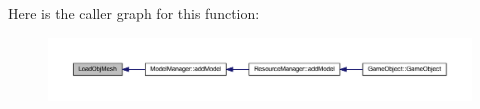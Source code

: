 Here is the caller graph for this function\+:\nopagebreak
\begin{figure}[H]
\begin{center}
\leavevmode
\includegraphics[width=350pt]{dd/dbc/_obj_loader_8cpp_aa84c4e033f99ef54ac11d3ac558c2f9c_icgraph}
\end{center}
\end{figure}


